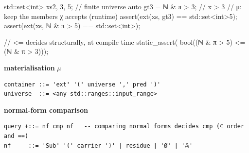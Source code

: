 \documentclass[11pt, a4paper]{article}
\begin{document}
\begin{listing}[htbp]
\caption{Extensional operations on sets in \emph{normal form}: the materialisation  (the partial $\mu$, a finite universe kept where $\chi$ accepts, into a ) and the comparisons \cppinline{==}/\cppinline{<=}.
\textbf{Top}: a finite  bounds an intensional halfspace, so their intersection always materialises even though the halfspace over $\mathbb{N}$ does not; the extensional and intensional readings compose.
 is a runtime retraction (it fills a ), not a  one.
\textbf{Right}: subset \cppinline{<=} decides \emph{structurally} on the normal form the carrier supplies, here two halfspaces, at compile time.
\textbf{Bottom}: the grammar in two panels; the boundaries / are Listing~\ref{lst:set-grammar}'s generators, and normal forms are compared by the set  over the single  (the subset order, Listing~\ref{lst:set-grammar}).}
\label{lst:materialise}
\noindent
\begin{minipage}[t]{0.49\linewidth}
\begin{cpp}
std::set<int> xs{2, 3, 5};       // finite universe
auto gt3 = ℕ & π > 3;     // {x > 3}
// μ: keep the members χ accepts (runtime)
assert(ext(xs, gt3)
       == std::set<int>{5});
assert(ext(xs, ℕ & π > 5)
       == std::set<int>{});
\end{cpp}
\end{minipage}\hfill
\begin{minipage}[t]{0.49\linewidth}
\begin{cpp}
// <= decides structurally, at compile time
static_assert(
  bool((ℕ & π > 5)
       <= (ℕ & π > 3)));
\end{cpp}
\end{minipage}

\vspace{0.6em}
\noindent
\begin{minipage}[t]{0.49\linewidth}
{\footnotesize\centering\textbf{materialisation} \ensuremath{\mu}\par}
\begin{verbatim}
container ::= 'ext' '(' universe ',' pred ')'
universe  ::= <any std::ranges::input_range>
\end{verbatim}
\end{minipage}\hfill
\begin{minipage}[t]{0.49\linewidth}
{\footnotesize\centering\textbf{normal-form comparison}\par}
\begin{verbatim}
query +::= nf cmp nf   -- comparing normal forms decides cmp (⊆ order and ==)
nf     ::= 'Sub' '(' carrier ')' | residue | 'Ø' | '𝔸'
\end{verbatim}
\end{minipage}
\end{listing}
\end{document}
